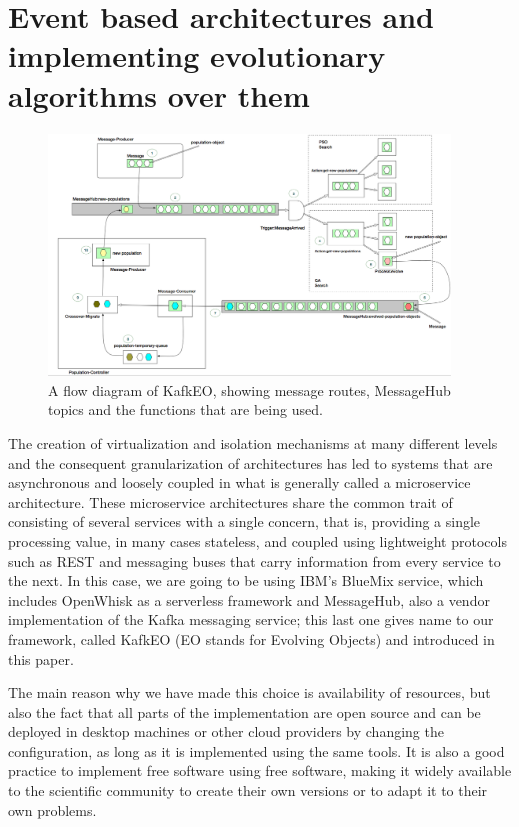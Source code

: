 \documentclass{llncs}
\begin{document}
  \section{Event based architectures and implementing evolutionary
    algorithms over them}
  \label{sec:methods}
  \begin{figure}[h!tbp]
  \includegraphics[width=0.95\textwidth]{img/kafkEO.png}
  \caption{A flow diagram of KafkEO, showing message routes, MessageHub
    topics and the functions that are being used.}
  \label{fig:kafkeo2}
  \end{figure}
  The creation of virtualization and isolation mechanisms at many
  different levels and the consequent granularization of architectures
  has led to systems that are asynchronous and loosely coupled in what
  is generally called a microservice architecture. These microservice
  architectures share the common trait of consisting of several services
  with a single concern, that is, providing a single processing value,
  in many cases stateless, and coupled using lightweight protocols such
  as REST and messaging buses that carry information from every service
  to the next. In this case, we are going to be using IBM's BlueMix
  service, which includes OpenWhisk as a serverless framework and
  MessageHub, also a vendor implementation of the Kafka messaging
  service; this last one gives name to our framework, called KafkEO (EO
  stands for Evolving Objects) and introduced in this paper.

  The main reason why we have made this choice is availability of
  resources, but also
  the fact that all parts of the implementation are open source and can
  be deployed in desktop machines or other cloud providers by changing
  the configuration, as long as it is implemented using the same tools. It is also a good practice to implement free
  software using free software, making it widely available to the
  scientific community to create their own versions or to adapt it to
  their own problems.
\end{document}
